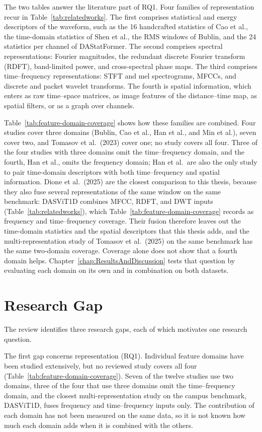 The two tables answer the literature part of RQ1. Four families of representation recur in Table~\ref{tab:relatedworks}. The first comprises statistical and energy descriptors of the waveform, such as the 16 handcrafted statistics of Cao et al., the time-domain statistics of Shen et al., the RMS windows of Bublin, and the 24 statistics per channel of DAStatFormer. The second comprises spectral representations: Fourier magnitudes, the redundant discrete Fourier transform (RDFT), band-limited power, and cross-spectral phase maps. The third comprises time--frequency representations: STFT and mel spectrograms, MFCCs, and discrete and packet wavelet transforms. The fourth is spatial information, which enters as raw time--space matrices, as image features of the distance--time map, as spatial filters, or as a graph over channels.

Table~\ref{tab:feature-domain-coverage} shows how these families are combined. Four studies cover three domains (Bublin, Cao et al., Han et al., and Min et al.), seven cover two, and Tomasov et al.\ (2023) cover one; no study covers all four. Three of the four studies with three domains omit the time--frequency domain, and the fourth, Han et al., omits the frequency domain; Han et al.\ are also the only study to pair time-domain descriptors with both time--frequency and spatial information. Dione et al.\ (2025) are the closest comparison to this thesis, because they also fuse several representations of the same window on the same benchmark: DASViT1D combines MFCC, RDFT, and DWT inputs (Table~\ref{tab:relatedworks}), which Table~\ref{tab:feature-domain-coverage} records as frequency and time--frequency coverage. Their fusion therefore leaves out the time-domain statistics and the spatial descriptors that this thesis adds, and the multi-representation study of Tomasov et al.\ (2025) on the same benchmark has the same two-domain coverage. Coverage alone does not show that a fourth domain helps. Chapter~\ref{chap:ResultsAndDiscussion} tests that question by evaluating each domain on its own and in combination on both datasets.

\section{Research Gap}
\label{sec:chap2ResearchGap}
The review identifies three research gaps, each of which motivates one research question.

The first gap concerns representation (RQ1). Individual feature domains have been studied extensively, but no reviewed study covers all four (Table~\ref{tab:feature-domain-coverage}). Seven of the twelve studies use two domains, three of the four that use three domains omit the time--frequency domain, and the closest multi-representation study on the campus benchmark, DASViT1D, fuses frequency and time--frequency inputs only. The contribution of each domain has not been measured on the same data, so it is not known how much each domain adds when it is combined with the others.

